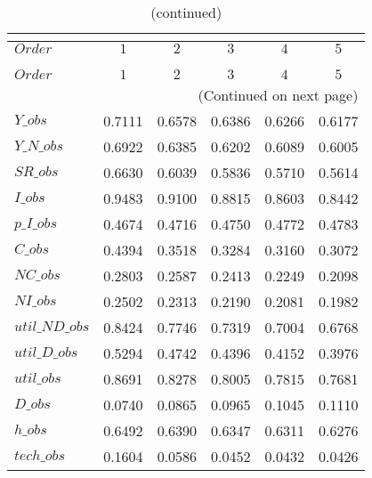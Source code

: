  
\begin{center}
\begin{longtable}{lccccc} 
\caption{COEFFICIENTS OF AUTOCORRELATION}\\
 \label{Table:th_autocorr_matrix}\\
\toprule 
$Order          $	 & 	 $         1$	 & 	 $         2$	 & 	 $         3$	 & 	 $         4$	 & 	 $         5$\\
\midrule \endfirsthead 
\caption{(continued)}\\
 \toprule \\ 
$Order          $	 & 	 $         1$	 & 	 $         2$	 & 	 $         3$	 & 	 $         4$	 & 	 $         5$\\
\midrule \endhead 
\midrule \multicolumn{6}{r}{(Continued on next page)} \\ \bottomrule \endfoot 
\bottomrule \endlastfoot 
$Y\_obs         $	 & 	    0.7111	 & 	    0.6578	 & 	    0.6386	 & 	    0.6266	 & 	    0.6177 \\ 
$Y\_N\_obs      $	 & 	    0.6922	 & 	    0.6385	 & 	    0.6202	 & 	    0.6089	 & 	    0.6005 \\ 
$SR\_obs        $	 & 	    0.6630	 & 	    0.6039	 & 	    0.5836	 & 	    0.5710	 & 	    0.5614 \\ 
$I\_obs         $	 & 	    0.9483	 & 	    0.9100	 & 	    0.8815	 & 	    0.8603	 & 	    0.8442 \\ 
$p\_I\_obs      $	 & 	    0.4674	 & 	    0.4716	 & 	    0.4750	 & 	    0.4772	 & 	    0.4783 \\ 
$C\_obs         $	 & 	    0.4394	 & 	    0.3518	 & 	    0.3284	 & 	    0.3160	 & 	    0.3072 \\ 
$NC\_obs        $	 & 	    0.2803	 & 	    0.2587	 & 	    0.2413	 & 	    0.2249	 & 	    0.2098 \\ 
$NI\_obs        $	 & 	    0.2502	 & 	    0.2313	 & 	    0.2190	 & 	    0.2081	 & 	    0.1982 \\ 
$util\_ND\_obs  $	 & 	    0.8424	 & 	    0.7746	 & 	    0.7319	 & 	    0.7004	 & 	    0.6768 \\ 
$util\_D\_obs   $	 & 	    0.5294	 & 	    0.4742	 & 	    0.4396	 & 	    0.4152	 & 	    0.3976 \\ 
$util\_obs      $	 & 	    0.8691	 & 	    0.8278	 & 	    0.8005	 & 	    0.7815	 & 	    0.7681 \\ 
$D\_obs         $	 & 	    0.0740	 & 	    0.0865	 & 	    0.0965	 & 	    0.1045	 & 	    0.1110 \\ 
$h\_obs         $	 & 	    0.6492	 & 	    0.6390	 & 	    0.6347	 & 	    0.6311	 & 	    0.6276 \\ 
$tech\_obs      $	 & 	    0.1604	 & 	    0.0586	 & 	    0.0452	 & 	    0.0432	 & 	    0.0426 \\ 
\end{longtable}
 \end{center}
